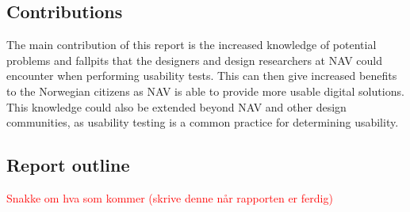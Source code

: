 \subsection{Contributions}
The main contribution of this report is the increased knowledge of potential problems and fallpits that the designers and design researchers at NAV could encounter when performing usability tests. This can then give increased benefits to the Norwegian citizens as NAV is able to provide more usable digital solutions. This knowledge could also be extended beyond NAV and other design communities, as usability testing is a common practice for determining usability.

\subsection{Report outline}

\textcolor{red}{Snakke om hva som kommer (skrive denne når rapporten er ferdig) }